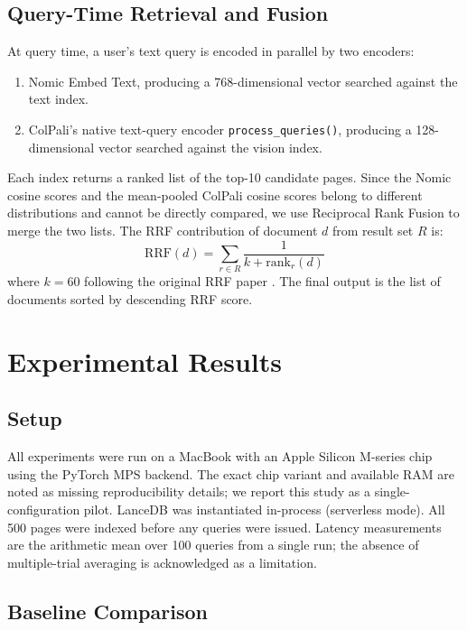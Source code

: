 \documentclass[conference]{IEEEtran}
\begin{document}
\subsection{Query-Time Retrieval and Fusion}
At query time, a user's text query is encoded in parallel by two encoders:
\begin{enumerate}
    \item Nomic Embed Text, producing a 768-dimensional vector searched against the text index.
    \item ColPali's native text-query encoder \texttt{process\_queries()}, producing a 128-dimensional vector searched against the vision index.
\end{enumerate}
Each index returns a ranked list of the top-10 candidate pages. Since the Nomic cosine scores and the mean-pooled ColPali cosine scores belong to different distributions and cannot be directly compared, we use Reciprocal Rank Fusion \cite{cormack2009reciprocal} to merge the two lists. The RRF contribution of document $d$ from result set $R$ is:
\begin{equation}
\text{RRF}(d) = \sum_{r \in R} \frac{1}{k + \text{rank}_r(d)}
\end{equation}
where $k = 60$ following the original RRF paper \cite{cormack2009reciprocal}. The final output is the list of documents sorted by descending RRF score.
 
\section{Experimental Results}
 
\subsection{Setup}
All experiments were run on a MacBook with an Apple Silicon M-series chip using the PyTorch MPS backend. The exact chip variant and available RAM are noted as missing reproducibility details; we report this study as a single-configuration pilot. LanceDB was instantiated in-process (serverless mode). All 500 pages were indexed before any queries were issued. Latency measurements are the arithmetic mean over 100 queries from a single run; the absence of multiple-trial averaging is acknowledged as a limitation.
 
\subsection{Baseline Comparison}
 
\end{document}
